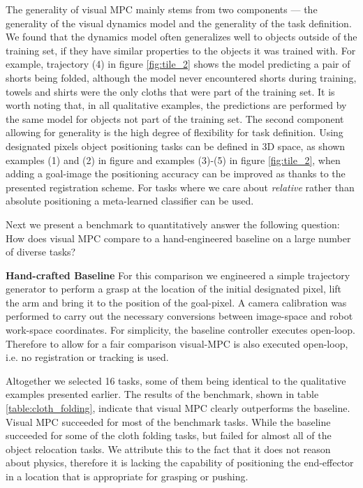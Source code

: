 The generality of visual MPC mainly stems from two components --- the generality of the visual dynamics model and the generality of the task definition.
We found that the dynamics model often generalizes well to objects outside of the training set, if they have similar properties to the objects it was trained with. For example, trajectory (4) in figure \ref{fig:tile_2} shows the model predicting a pair of shorts being folded, although the model never encountered shorts during training, towels and shirts were the only cloths that were part of the training set. It is worth noting that, in all qualitative examples, the predictions are performed by the same model for objects not part of the training set.
The second component allowing for generality is the high degree of flexibility for task definition. Using designated pixels object positioning tasks can be defined in 3D space, as shown examples (1) and (2) in figure and examples (3)-(5) in figure \ref{fig:tile_2}, when adding a goal-image the positioning accuracy can be improved as thanks to the presented registration scheme. For tasks where we care about \emph{relative} rather than absolute positioning a meta-learned classifier can be used.

Next we present a benchmark to quantitatively answer the following question: How does visual MPC compare to a hand-engineered baseline on a large number of diverse tasks?  

\noindent \textbf{Hand-crafted Baseline} For this comparison we engineered a simple trajectory generator to perform a grasp at the location of the initial designated pixel, lift the arm and bring it to the position of the goal-pixel. A camera calibration was performed to carry out the necessary conversions between image-space and robot work-space coordinates. For simplicity, the baseline controller executes open-loop. Therefore to allow for a fair comparison visual-MPC is also executed open-loop, i.e. no registration or tracking is used.

Altogether we selected 16 tasks, some of them being identical to the qualitative examples presented earlier.
The results of the benchmark, shown in table \ref{table:cloth_folding}, indicate that visual MPC clearly outperforms the baseline. 
Visual MPC succeeded for most of the benchmark tasks. While the baseline succeeded for some of the cloth folding tasks, but failed for almost all of the object relocation tasks. We attribute this to the fact that it does not reason about physics, therefore it is lacking the capability of positioning the end-effector in a location that is appropriate for grasping or pushing. 

